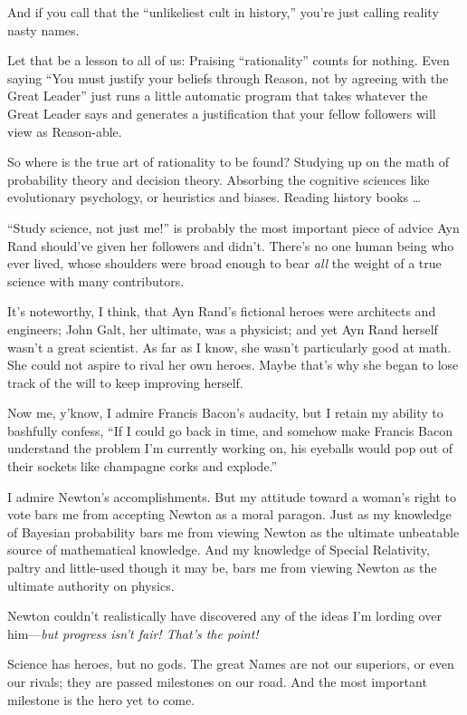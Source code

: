 {
 And if you call that the ``unlikeliest cult in
history,'' you're just calling
reality nasty names.}

{
 Let that be a lesson to all of us: Praising
``rationality'' counts for nothing.
Even saying ``You must justify your beliefs through
Reason, not by agreeing with the Great Leader'' just
runs a little automatic program that takes whatever the Great Leader
says and generates a justification that your fellow followers will view
as Reason-able.}

{
 So where is the true art of rationality to be found? Studying up
on the math of probability theory and decision theory. Absorbing the
cognitive sciences like evolutionary psychology, or heuristics and
biases. Reading history books \ldots}

{
 ``Study science, not just me!''
is probably the most important piece of advice Ayn Rand
should've given her followers and
didn't. There's no one human being who
ever lived, whose shoulders were broad enough to bear \textit{all} the
weight of a true science with many contributors.}

{
 It's noteworthy, I think, that Ayn
Rand's fictional heroes were architects and engineers;
John Galt, her ultimate, was a physicist; and yet Ayn Rand herself
wasn't a great scientist. As far as I know, she
wasn't particularly good at math. She could not aspire
to rival her own heroes. Maybe that's why she began to
lose track of the will to keep improving herself.}

{
 Now me, y'know, I admire Francis
Bacon's audacity, but I retain my ability to bashfully
confess, ``If I could go back in time, and somehow
make Francis Bacon understand the problem I'm currently
working on, his eyeballs would pop out of their sockets like champagne
corks and explode.''}

{
 I admire Newton's accomplishments. But my attitude
toward a woman's right to vote bars me from accepting
Newton as a moral paragon. Just as my knowledge of Bayesian probability
bars me from viewing Newton as the ultimate unbeatable source of
mathematical knowledge. And my knowledge of Special Relativity, paltry
and little-used though it may be, bars me from viewing Newton as the
ultimate authority on physics.}

{
 Newton couldn't realistically have discovered any
of the ideas I'm lording over him---\textit{but
progress isn't fair! That's the
point!}}

{
 Science has heroes, but no gods. The great Names are not our
superiors, or even our rivals; they are passed milestones on our road.
And the most important milestone is the hero yet to come.}

